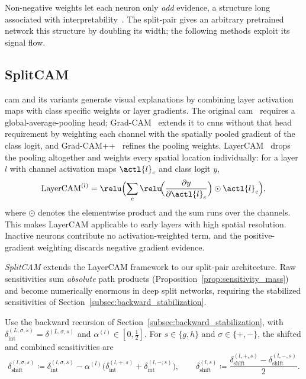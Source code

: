 Non-negative weights let each neuron only \emph{add} evidence, a structure long associated with interpretability~\parencite{ayinde2018nonnegativity,lee1999nmf}. The split-pair gives an arbitrary pretrained network this structure by doubling its width; the following methods exploit its signal flow.

\subsection{SplitCAM}\label{sec:split_cam}

\ac{cam} and its variants generate visual explanations by combining layer activation maps with class specific weights or layer gradients. The original \ac{cam}~\parencite{Zhou2016} requires a global-average-pooling head; Grad-CAM~\parencite{Selvaraju2017} extends it to \acp{cnn} without that head requirement by weighting each channel with the spatially pooled gradient of the class logit, and Grad-CAM++~\parencite{Chattopadhay2018} refines the pooling weights. LayerCAM~\parencite{Jiang2021LayerCAM} drops the pooling altogether and weights every spatial location individually: for a layer $l$ with channel activation maps $\actl{l}_c$ and class logit $y$,
\begin{equation}
	\text{LayerCAM}^{(l)} = \relu\Bigl( \sum_{c} \relu\!\Bigl(\frac{\partial y}{\partial \actl{l}_c}\Bigr) \odot \actl{l}_c \Bigr),
	\label{eq:layercam}
\end{equation}
where $\odot$ denotes the elementwise product and the sum runs over the channels. This makes LayerCAM applicable to early layers with high spatial resolution. Inactive neurons contribute no activation-weighted term, and the positive-gradient weighting discards negative gradient evidence.

\emph{SplitCAM} extends the LayerCAM framework to our split-pair architecture. Raw sensitivities sum \emph{absolute} path products (Proposition~\ref{prop:sensitivity_mass}) and become numerically enormous in deep split networks, requiring the stabilized sensitivities of Section~\ref{subsec:backward_stabilization}.

\begin{definition}\label{def:shifted_sensitivities}
Use the backward recursion of Section~\ref{subsec:backward_stabilization}, with $\delta_{\mathrm{int}}^{(L,\sigma,s)}=\delta^{(L,\sigma,s)}$ and $\alpha^{(l)}\in[0,\tfrac12]$. For $s\in\{g,h\}$ and $\sigma\in\{+,-\}$, the shifted and combined sensitivities are
\begin{equation}
	\delta_{\mathrm{shift}}^{(l,\sigma, s)}
	\coloneqq \delta_{\mathrm{int}}^{(l,\sigma, s)} - \alpha^{(l)} \bigl( \delta_{\mathrm{int}}^{(l, +, s)} + \delta_{\mathrm{int}}^{(l, -, s)} \bigr),
	\qquad
	\delta_{\mathrm{shift}}^{(l, s)} \coloneqq \frac{\delta_{\mathrm{shift}}^{(l, +, s)} - \delta_{\mathrm{shift}}^{(l, -, s)}}{2}.
	\label{eq:shift_definition}
\end{equation}
\end{definition}

